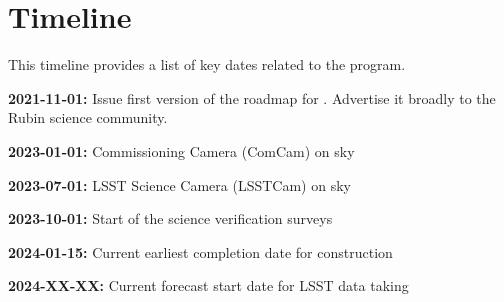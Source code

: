 \section{Timeline} \label{sec:timeline}

This timeline provides a list of key dates  related to the \es program. 

{\bf 2021-11-01:} Issue first version of the \ro roadmap for \es. Advertise it broadly to the Rubin science community. 

{\bf 2023-01-01:} Commissioning Camera (ComCam) on sky

{\bf 2023-07-01:} LSST Science Camera (LSSTCam) on sky

{\bf 2023-10-01:} Start of the science verification surveys

{\bf 2024-01-15:} Current earliest completion date for construction

{\bf 2024-XX-XX:} Current forecast start date for LSST data taking

